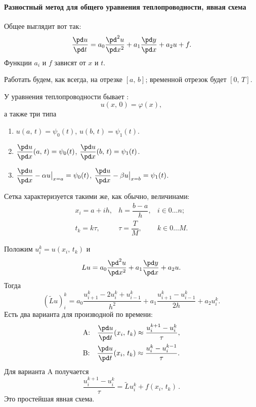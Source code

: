 \documentclass{trlnotes}
\begin{document}
\paragraph{Разностный метод для общего уравнения теплопроводности, явная схема}

\begin{de}
	Общее  выглядит вот так:
	\[
		\dfrac{\pd u}{\pd t} = a_0 \dfrac{\pd^2 u}{\pd x^2} + a_1 \dfrac{\pd y}{\pd x} + a_2 u + f.
	\]
	Функции $a_i$ и $f$ зависят от $x$ и $t$.
\end{de}

Работать будем, как всегда, на отрезке $[a, \, b]$; временной отрезок будет $[0, \, T]$.

\begin{de}
	У уравнения теплопроводности бывает :
	\[
		u(x, \, 0) = \varphi(x),            
	\]
	а также три типа 
	\begin{enumerate}
		\item $u(a, \, t) = \psi_0(t)$, $u(b, \, t) = \psi_1(t)$.
		\item $\dfrac{\pd u}{\pd x}(a, \, t) = \psi_0(t)$, $\dfrac{\pd u}{\pd x}(b, \, t) = \psi_1(t)$.
		\item $\dfrac{\pd u}{\pd x} - \alpha u \big|_{x = a} = \psi_0(t)$, $\dfrac{\pd u}{\pd x} - \beta u \big|_{x = b} = \psi_1(t)$.
	\end{enumerate}
\end{de}
Сетка характеризуется такими же, как обычно, величинами:
\[
	\begin{array}{lll}
		x_i = a + ih, & h = \dfrac{b - a}{h}, & i \in 0\ldots n; \\
		t_k = k\tau, & \tau = \dfrac{T}{M}, & k \in 0 \ldots M.
	\end{array}
\]

Положим $u_i^k = u(x_i, \, t_k)$ и
\[
	Lu = a_0 \dfrac{\pd^2 u}{\pd x^2} + a_1 \dfrac{\pd y}{\pd x} + a_2 u.
\]
Тогда
\[
	(\tilde{L}u)_i^k = a_0 \dfrac{u_{i+1}^k - 2u_i^k + u_{i - 1}^k}{h^2} + a_1 \dfrac{u_{i + 1}^k - u_{i - 1}^k}{2h} + a_2 u_i^k.
\]
Есть два варианта для производной по времени:
\begin{align}\label{eq:therm-A-B}
				&\text{A:} \quad \dfrac{\pd u}{\pd t}(x_i, \, t_k) \approx \dfrac{u^{k + 1}_i - u^k_i}{\tau}, \\
				&\text{B:} \quad \dfrac{\pd u}{\pd t}(x_i, \, t_k) \approx \dfrac{u^{k}_i - u^{k-1}_i}{\tau}.
\end{align}
Для варианта A получается 
\[
	\boxed{\dfrac{u_i^{k + 1} - u_i^k}{\tau} = \tilde{L}u_i^k + f(x_i, \, t_k)}\,.
\]
Это простейшая явная схема. 
\end{document}
